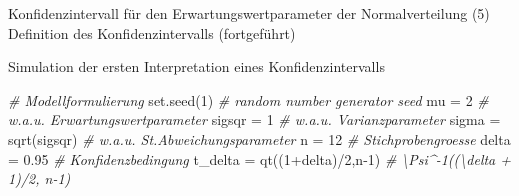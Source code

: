 \documentclass[
  8pt,
  ignorenonframetext,
]{beamer}
\newenvironment{Shaded}{\begin{snugshade}}{\end{snugshade}}
\newcommand{\CommentTok}[1]{\textcolor[rgb]{0.56,0.35,0.01}{\textit{#1}}}
\newcommand{\DecValTok}[1]{\textcolor[rgb]{0.00,0.00,0.81}{#1}}
\newcommand{\FloatTok}[1]{\textcolor[rgb]{0.00,0.00,0.81}{#1}}
\newcommand{\FunctionTok}[1]{\textcolor[rgb]{0.00,0.00,0.00}{#1}}
\newcommand{\NormalTok}[1]{#1}
\newcommand{\OtherTok}[1]{\textcolor[rgb]{0.56,0.35,0.01}{#1}}
\newcommand{\SpecialCharTok}[1]{\textcolor[rgb]{0.00,0.00,0.00}{#1}}
\begin{document}
\begin{frame}[fragile]{Konfidenzintervall für den
Erwartungswertparameter der Normalverteilung}
\protect\hypertarget{konfidenzintervall-fuxfcr-den-erwartungswertparameter-der-normalverteilung-6}{}
\noindent(5) Definition des Konfidenzintervalls (fortgeführt)

\small

Simulation der ersten Interpretation eines Konfidenzintervalls
\vspace{2mm}

\footnotesize

\begin{Shaded}
\begin{Highlighting}[]
\CommentTok{\# Modellformulierung}
\FunctionTok{set.seed}\NormalTok{(}\DecValTok{1}\NormalTok{)                                        }\CommentTok{\# random number generator seed}
\NormalTok{mu      }\OtherTok{=} \DecValTok{2}                                        \CommentTok{\# w.a.u. Erwartungswertparameter}
\NormalTok{sigsqr  }\OtherTok{=} \DecValTok{1}                                        \CommentTok{\# w.a.u. Varianzparameter}
\NormalTok{sigma   }\OtherTok{=} \FunctionTok{sqrt}\NormalTok{(sigsqr)                             }\CommentTok{\# w.a.u. St.Abweichungsparameter}
\NormalTok{n       }\OtherTok{=} \DecValTok{12}                                       \CommentTok{\# Stichprobengroesse}
\NormalTok{delta   }\OtherTok{=} \FloatTok{0.95}                                     \CommentTok{\# Konfidenzbedingung}
\NormalTok{t\_delta }\OtherTok{=} \FunctionTok{qt}\NormalTok{((}\DecValTok{1}\SpecialCharTok{+}\NormalTok{delta)}\SpecialCharTok{/}\DecValTok{2}\NormalTok{,n}\DecValTok{{-}1}\NormalTok{)                      }\CommentTok{\# \textbackslash{}Psi\^{}{-}1((\textbackslash{}delta + 1)/2, n{-}1)}


\end{Highlighting}
\end{Shaded}
\end{frame}
\end{document}
